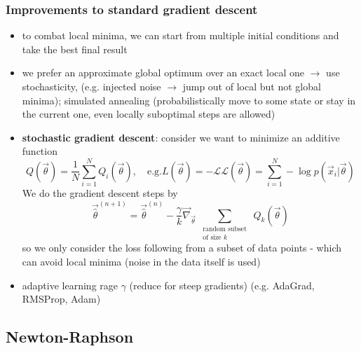 \subsubsection{Improvements to standard gradient descent}
\begin{itemize}
    \item to combat local minima, we can start from multiple initial conditions and take the best final result
    \item we prefer an approximate global optimum over an exact local one $\rightarrow$ use stochasticity, 
    (e.g. injected noise $\rightarrow$ jump out of local but not global minima); simulated annealing (probabilistically 
    move to some state or stay in the current one, even locally suboptimal steps are allowed)
    \item \textbf{stochastic gradient descent}: consider we want to minimize an additive function
    \begin{equation}
        Q(\vec{\theta}) = \frac{1}{N} \sum_{i=1}^N Q_i(\vec{\theta}), \quad \text{e.g.} L(\vec{\theta}) = -\mathcal{LL}(\vec{\theta}) = \sum_{i=1}^N -\log p(\vec{x}_i | \vec{\theta})
    \end{equation}
    We do the gradient descent steps by
    \begin{equation}
        \vec{\hat{\theta}}^{(n+1)}=\vec{\hat{\theta}}^{(n)}-\frac{\gamma}{k} \vec{\nabla}_{\vec{\theta}} \sum_{\substack{\text { random subset } \\ \text { of size } k}} Q_k(\vec{\theta})
    \end{equation}
    so we only consider the loss following from a subset of data points - which can avoid local minima (noise
    in the data itself is used)
    \item adaptive learning rage $\gamma$ (reduce for steep gradients) (e.g. AdaGrad, RMSProp, Adam)
\end{itemize}

\subsection{Newton-Raphson}

